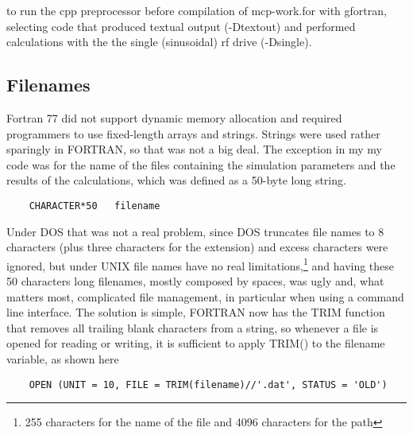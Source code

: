 to run the \textsf{cpp} preprocessor before compilation of \textsf{mcp-work.for} with \textsf{gfortran}, selecting code that produced textual output (\textsf{-Dtextout}) and performed calculations with the the single (sinusoidal) rf drive (\textsf{-Dsingle}).



\subsection{Filenames}

Fortran 77 did not support dynamic memory allocation and required programmers to use fixed-length arrays and strings. Strings were used rather sparingly in FORTRAN, so that was not a big deal. The exception in my my code was for the name of the files containing the simulation parameters and the results of the calculations, which was defined as a 50-byte long string.

\begin{lstlisting}
	CHARACTER*50   filename
\end{lstlisting}


Under DOS that was not a real problem, since DOS truncates file names to 8 characters (plus three characters for the extension) and excess characters were ignored, but under UNIX file names have no real limitations,\footnote{255 characters for the name of the file and 4096 characters for the path} and having these 50 characters long filenames, mostly composed by spaces, was ugly and, what matters most, complicated file management, in particular when using a command line interface.
The solution is simple, FORTRAN now has the \textsf{TRIM} function that removes all trailing blank characters from a string, so whenever a file is opened for reading or writing, it is sufficient to apply \textsf{TRIM()} to the \textsf{filename} variable, as shown here

\begin{lstlisting}
	OPEN (UNIT = 10, FILE = TRIM(filename)//'.dat', STATUS = 'OLD')
\end{lstlisting}



